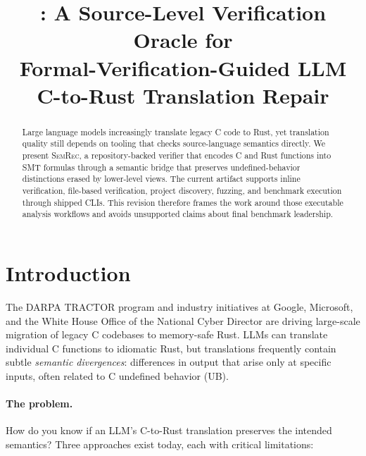 \documentclass[11pt]{article}
\title{\semrec{}: A Source-Level Verification Oracle for\\
       Formal-Verification-Guided LLM C-to-Rust Translation Repair}
\date{}
\newcommand{\semrec}{\textsc{SemRec}}
\begin{document}
\maketitle

\begin{abstract}
Large language models increasingly translate legacy C code to Rust, yet
translation quality still depends on tooling that checks source-language
semantics directly. We present \semrec{}, a repository-backed verifier that
encodes C and Rust functions into SMT formulas through a semantic bridge that
preserves undefined-behavior distinctions erased by lower-level views. The
current artifact supports inline verification, file-based verification, project
discovery, fuzzing, and benchmark execution through shipped CLIs. This revision
therefore frames the work around those executable analysis workflows and avoids
unsupported claims about final benchmark leadership.
\end{abstract}

\section{Introduction}\label{sec:intro}

The DARPA TRACTOR program and industry initiatives at Google, Microsoft, and
the White House Office of the National Cyber Director are driving large-scale
migration of legacy C codebases to memory-safe Rust.  LLMs can translate
individual C functions to idiomatic Rust, but translations frequently contain
subtle \emph{semantic divergences}: differences in output that arise only at
specific inputs, often related to C undefined behavior (UB).

\paragraph{The problem.}
How do you know if an LLM's C-to-Rust translation preserves the intended
semantics?  Three approaches exist today, each with critical limitations:
\end{document}
